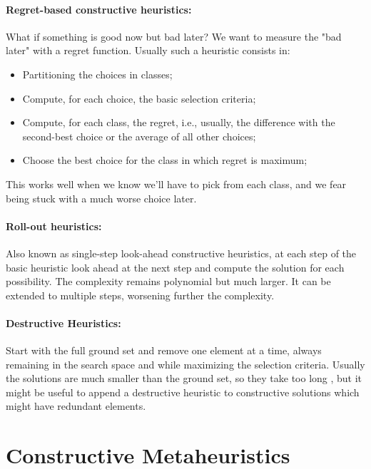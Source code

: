\documentclass{article}
\begin{document}
	\paragraph{Regret-based constructive heuristics:} What if something is good now but bad later? We want to measure the "bad later" with a regret function. Usually such a heuristic consists in:
	\begin{itemize}
		\item Partitioning the choices in classes;
		\item Compute, for each choice, the basic selection criteria;
		\item Compute, for each class, the regret, i.e., usually, the difference with the second-best choice or the average of all other choices;
		\item Choose the best choice for the class in which regret is maximum;
	\end{itemize}
	This works well when we know we'll have to pick from each class, and we fear being stuck with a much worse choice later.\\
	
	\paragraph{Roll-out heuristics:} Also known as single-step look-ahead constructive heuristics, at each step of the basic heuristic look ahead at the next step and compute the solution for each possibility. The complexity remains polynomial but much larger. It can be extended to multiple steps, worsening further the complexity.\\
	
	\paragraph{Destructive Heuristics:} Start with the full ground set and remove one element at a time, always remaining in the search space and while maximizing the selection criteria. Usually the solutions are much smaller than the ground set, so they take too long , but it might be useful to append a destructive heuristic to constructive solutions which might have redundant elements.\\
	
	\section*{Constructive Metaheuristics}
	
\end{document}
